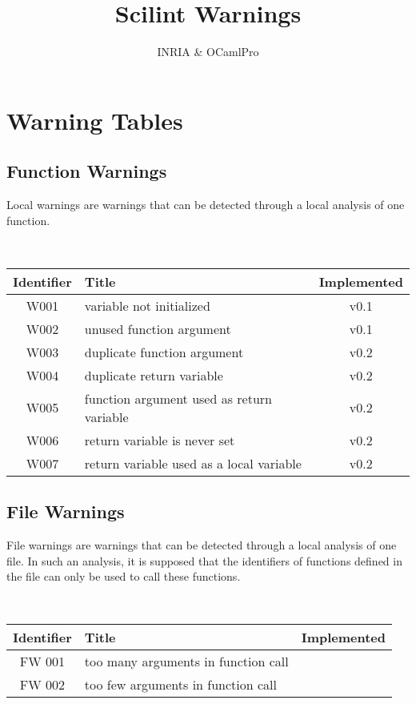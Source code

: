 \documentclass{article}
\title{Scilint Warnings}
\author{INRIA \& OCamlPro}
\begin{document}
\maketitle

\section{Warning Tables}


\subsection{Function Warnings}

Local warnings are warnings that can be detected through a local analysis of
one function.

\noindent\\\begin{tabular}{|c|p{8cm}|c|} \hline
Identifier & Title & Implemented          \\ \hline
W001 & variable not initialized & v0.1 \\ \hline
W002 & unused function argument & v0.1 \\ \hline
W003 & duplicate function argument & v0.2 \\ \hline
W004 & duplicate return variable   & v0.2 \\ \hline
W005 & function argument used as return variable   & v0.2 \\ \hline
W006 & return variable is never set & v0.2 \\ \hline
W007 & return variable used as a local variable & v0.2 \\ \hline
\end{tabular}

\subsection{File Warnings}

File warnings are warnings that can be detected through a local
analysis of one file. In such an analysis, it is supposed that the
identifiers of functions defined in the file can only be used to call
these functions.

\noindent\\\begin{tabular}{|c|p{8cm}|c|} \hline
Identifier & Title & Implemented          \\ \hline
FW 001 & too many arguments in function call & \\ \hline
FW 002 & too few arguments in function call  & \\ \hline
\end{tabular}
\end{document}
